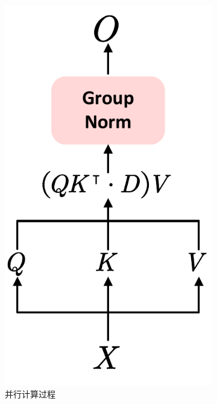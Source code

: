 \begin{figure}[h]
    \centering
    \begin{subfigure}[b]{0.23\textwidth}
        \centering
        \includegraphics[width=\linewidth]{Img/并行计算过程.pdf}
        \caption{并行计算过程}
        \label{fig:4-3_a}
    \end{subfigure}
    \begin{subfigure}[b]{0.58\textwidth}
        \centering

\end{subfigure}
\end{figure}
